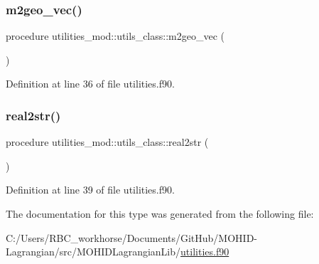 \subsubsection{\texorpdfstring{m2geo\+\_\+vec()}{m2geo\_vec()}}
{\footnotesize\ttfamily procedure utilities\+\_\+mod\+::utils\+\_\+class\+::m2geo\+\_\+vec (\begin{DoxyParamCaption}{ }\end{DoxyParamCaption})\hspace{0.3cm}{\ttfamily [private]}}



Definition at line 36 of file utilities.\+f90.

\mbox{\label{structutilities__mod_1_1utils__class_a150e3763affd525139f135d6cbbca026}} 
\subsubsection{\texorpdfstring{real2str()}{real2str()}}
{\footnotesize\ttfamily procedure utilities\+\_\+mod\+::utils\+\_\+class\+::real2str (\begin{DoxyParamCaption}{ }\end{DoxyParamCaption})\hspace{0.3cm}{\ttfamily [private]}}



Definition at line 39 of file utilities.\+f90.



The documentation for this type was generated from the following file\+:\begin{DoxyCompactItemize}
\item 
C\+:/\+Users/\+R\+B\+C\+\_\+workhorse/\+Documents/\+Git\+Hub/\+M\+O\+H\+I\+D-\/\+Lagrangian/src/\+M\+O\+H\+I\+D\+Lagrangian\+Lib/\mbox{\hyperlink{utilities_8f90}{utilities.\+f90}}\end{DoxyCompactItemize}
